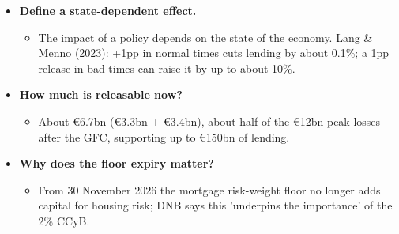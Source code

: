 \documentclass[10pt]{article}
\begin{document}
\begin{tcolorbox}[sbox,width=0.495\linewidth,height=14.6cm,nobeforeafter,box align=top,fit basedim=11pt,colframe=nlred!70,colbacktitle=nlred!8,coltitle=nlred,title=LIKELY CHALLENGES · definitions and logic]
\begin{itemize}
\item[\textcolor{navy}{\textbf{Q}}] \textbf{Define a state-dependent effect.}
\begin{itemize}
\item The impact of a policy depends on the state of the economy. Lang \& Menno (2023): +1pp in normal times cuts lending by about 0.1\%; a 1pp release in bad times can raise it by up to about 10\%.
\end{itemize}
\item[\textcolor{navy}{\textbf{Q}}] \textbf{How much is releasable now?}
\begin{itemize}
\item About €6.7bn (€3.3bn + €3.4bn), about half of the €12bn peak losses after the GFC, supporting up to €150bn of lending.
\end{itemize}
\item[\textcolor{navy}{\textbf{Q}}] \textbf{Why does the floor expiry matter?}
\begin{itemize}
\item From 30 November 2026 the mortgage risk-weight floor no longer adds capital for housing risk; DNB says this 'underpins the importance' of the 2\% CCyB.
\end{itemize}
\end{itemize}
\end{tcolorbox}
\newpage
\end{document}
